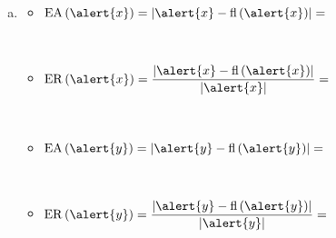 \begin{frame}
\begin{solution}
\begin{enumerate}[a)]
\begin{multicols}{2}
\begin{itemize}
					            \begin{math}
						            \operatorname{fl}\left(\alert{y}\right)= 0.43258
					            \end{math}
				      \end{itemize}
			      \end{multicols}

			\item

			      \begin{multicols}{2}
				      \begin{itemize}

					      \item

					            \begin{math}
						            \operatorname{EA}\left(\alert{x}\right)=
						            \left
						            |\alert{x}-
						            \operatorname{fl}\left(\alert{x}\right)
						            \right|=
					            \end{math}

					            \

					      \item

					            \begin{math}
						            \operatorname{ER}\left(\alert{x}\right)=
						            \dfrac{
							            \left|
							            \alert{x}-
							            \operatorname{fl}\left(\alert{x}\right)
							            \right|}{
							            \left|
							            \alert{x}
							            \right|}=
					            \end{math}

					            \

					      \item

					            \begin{math}
						            \operatorname{EA}\left(\alert{y}\right)=
						            \left|
						            \alert{y}-
						            \operatorname{fl}\left(\alert{y}\right)
						            \right|=
					            \end{math}

					            \

					      \item

					            \begin{math}
						            \operatorname{ER}\left(\alert{y}\right)=
						            \dfrac{
							            \left|
							            \alert{y}-
							            \operatorname{fl}\left(\alert{y}\right)
							            \right|}{
							            \left|
							            \alert{y}
							            \right|}=
					            \end{math}
				      \end{itemize}
			      \end{multicols}
		\end{enumerate}
	\end{solution}
\end{frame}

